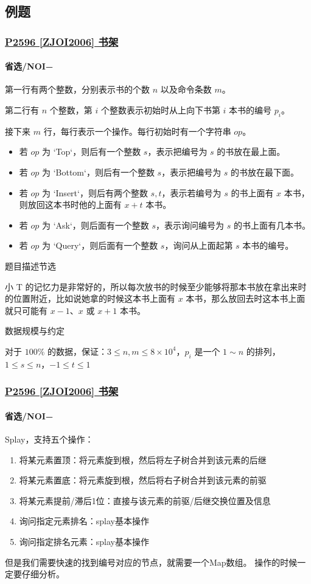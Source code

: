 \documentclass[utf8]{ctexbeamer}
\begin{document}
    \subsection{例题}

    \begin{frame}
        \frametitle{\href{https://www.luogu.com.cn/problem/P2596}{P2596 [ZJOI2006] 书架}}
        \framesubtitle{\textcolor[RGB]{157,61,207}{省选/NOI−}}
        \tiny
        第一行有两个整数，分别表示书的个数 $n$ 以及命令条数 $m$。

        第二行有 $n$ 个整数，第 $i$ 个整数表示初始时从上向下书第 $i$ 本书的编号 $p_i$。

        接下来 $m$ 行，每行表示一个操作。每行初始时有一个字符串  $op$。

        \begin{itemize}
            \item 若 $op$ 为 `Top`，则后有一个整数 $s$，表示把编号为 $s$ 的书放在最上面。
            \item 若 $op$ 为 `Bottom`，则后有一个整数 $s$，表示把编号为 $s$ 的书放在最下面。
            \item 若 $op$ 为 `Insert`，则后有两个整数 $s, t$，表示若编号为 $s$ 的书上面有 $x$ 本书，则放回这本书时他的上面有 $x + t$ 本书。
            \item 若 $op$ 为 `Ask`，则后面有一个整数 $s$，表示询问编号为 $s$ 的书上面有几本书。
            \item 若 $op$ 为 `Query`，则后面有一个整数 $s$，询问从上面起第 $s$ 本书的编号。
        \end{itemize}

        题目描述节选

        小 T 的记忆力是非常好的，所以每次放书的时候至少能够将那本书放在拿出来时的位置附近，比如说她拿的时候这本书上面有 $x$ 本书，那么放回去时这本书上面就只可能有 $x-1$、$x$ 或 $x+1$ 本书。

        数据规模与约定

        对于 $100\%$ 的数据，保证：$3 \leq n, m \leq 8 \times 10^4$，$p_i$ 是一个 $1 \sim n$ 的排列，$1 \leq s \leq n$，$-1 \leq t \leq 1$
    \end{frame}

    \begin{frame}
        \frametitle{\href{https://www.luogu.com.cn/problem/P2596}{P2596 [ZJOI2006] 书架}}
        \framesubtitle{\textcolor[RGB]{157,61,207}{省选/NOI−}}
        Splay，支持五个操作：
        \begin{enumerate}
            \item 将某元素置顶：将元素旋到根，然后将左子树合并到该元素的后继
            \item 将某元素置底：将元素旋到根，然后将右子树合并到该元素的前驱
            \item 将某元素提前/滞后1位：直接与该元素的前驱/后继交换位置及信息
            \item 询问指定元素排名：splay基本操作
            \item 询问指定排名元素：splay基本操作
        \end{enumerate}
        但是我们需要快速的找到编号对应的节点，就需要一个Map数组。
        操作的时候一定要仔细分析。
    \end{frame}
\end{document}
